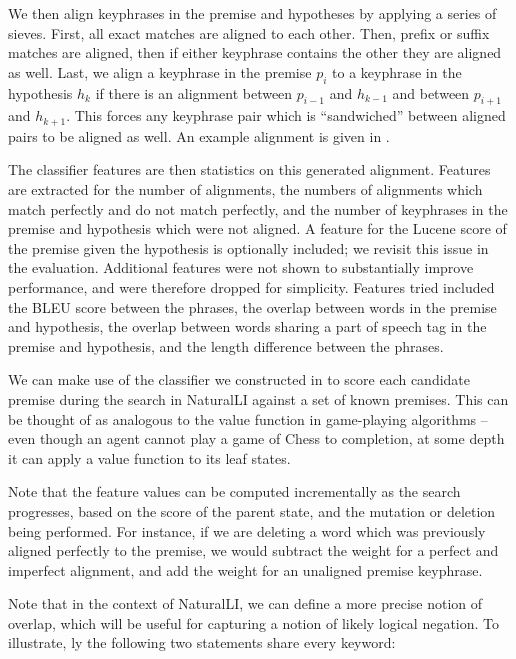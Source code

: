 We then align keyphrases in the premise and hypotheses by applying a series of sieves.
First, all exact matches are aligned to each other.
Then, prefix or suffix matches are aligned, then if either keyphrase contains
  the other they are aligned as well.
Last, we align a keyphrase in the premise $p_i$ to a keyphrase in the hypothesis
  $h_k$ if there is an alignment between $p_{i-1}$ and $h_{k-1}$ and between
  $p_{i+1}$ and $h_{k+1}$.
This forces any keyphrase pair which is ``sandwiched'' between aligned pairs to be
  aligned as well.
An example alignment is given in .

The classifier features are then statistics on this generated alignment.
Features are extracted for the number of alignments, the numbers of alignments
  which match perfectly and do not match perfectly, 
  and the number of keyphrases in the premise and hypothesis
  which were not aligned.
A feature for the Lucene score of the premise given the hypothesis is optionally
  included; we revisit this issue in the evaluation.
Additional features were not shown to substantially improve performance, and
  were therefore dropped for simplicity.
Features tried included the BLEU score between the phrases, the overlap between
  words in the premise and hypothesis, the overlap between words sharing a 
  part of speech tag in the premise and hypothesis, and the length difference
  between the phrases.

%
%
We can make use of the classifier we constructed in 
   to score each candidate premise during
  the search in NaturalLI against a set of known premises.
This can be thought of as analogous to the value function in game-playing
  algorithms -- even though an agent cannot play a game of Chess to completion,
  at some depth it can apply a value function to its leaf states.

Note that the feature values can be computed incrementally as the search
  progresses, based on the score of the parent state, and the mutation or
  deletion being performed.
For instance, if we are deleting a word which was previously aligned perfectly
  to the premise, we would subtract the weight for a perfect and imperfect
  alignment, and add the weight for an unaligned premise keyphrase.

Note that in the context of NaturalLI, we can define a more precise notion of
  overlap, which will be useful for capturing a notion of likely logical
  negation.
To illustrate, \naive ly the following two statements share every keyword:

